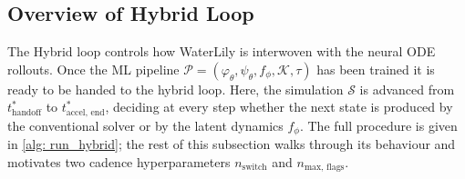 
%     




\subsection{Overview of Hybrid Loop}
\label{subsect: Hybrid}

The Hybrid loop controls how WaterLily is interwoven with the neural ODE rollouts. Once the ML pipeline $\mathcal{P} = (\varphi_\theta, \psi_\theta, f_\phi, \mathcal{K}, \tau)$ has been trained it is ready to be handed to the hybrid loop. Here, the simulation $\mathcal{S}$ is advanced from $t^*_\text{handoff}$ to $t^*_\text{accel, end}$, deciding at every step whether the next state is produced by the conventional solver or by the latent dynamics $f_\phi$. The full procedure is given in \autoref{alg: run_hybrid}; the rest of this subsection walks through its behaviour and motivates two cadence hyperparameters $n_\text{switch}$ and $n_\text{max, flags}$.


